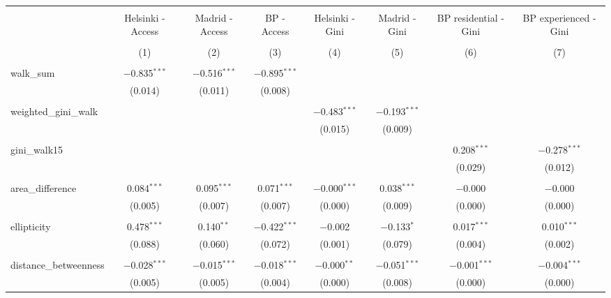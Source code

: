 
\begin{table}[!htbp] \centering 
  \caption{} 
  \label{} 
\begin{tabular}{@{\extracolsep{5pt}}lccccccc} 
\\[-1.8ex]\hline 
\hline \\[-1.8ex] 
 & Helsinki - Access & Madrid - Access & BP - Access & Helsinki - Gini & Madrid - Gini & BP residential - Gini & BP experienced - Gini \\ 
\\[-1.8ex] & (1) & (2) & (3) & (4) & (5) & (6) & (7)\\ 
\hline \\[-1.8ex] 
 walk\_sum & $-$0.835$^{***}$ & $-$0.516$^{***}$ & $-$0.895$^{***}$ &  &  &  &  \\ 
  & (0.014) & (0.011) & (0.008) &  &  &  &  \\ 
  & & & & & & & \\ 
 weighted\_gini\_walk &  &  &  & $-$0.483$^{***}$ & $-$0.193$^{***}$ &  &  \\ 
  &  &  &  & (0.015) & (0.009) &  &  \\ 
  & & & & & & & \\ 
 gini\_walk15 &  &  &  &  &  & 0.208$^{***}$ & $-$0.278$^{***}$ \\ 
  &  &  &  &  &  & (0.029) & (0.012) \\ 
  & & & & & & & \\ 
 area\_difference & 0.084$^{***}$ & 0.095$^{***}$ & 0.071$^{***}$ & $-$0.000$^{***}$ & 0.038$^{***}$ & $-$0.000 & $-$0.000 \\ 
  & (0.005) & (0.007) & (0.007) & (0.000) & (0.009) & (0.000) & (0.000) \\ 
  & & & & & & & \\ 
 ellipticity & 0.478$^{***}$ & 0.140$^{**}$ & $-$0.422$^{***}$ & $-$0.002 & $-$0.133$^{*}$ & 0.017$^{***}$ & 0.010$^{***}$ \\ 
  & (0.088) & (0.060) & (0.072) & (0.001) & (0.079) & (0.004) & (0.002) \\ 
  & & & & & & & \\ 
 distance\_betweenness & $-$0.028$^{***}$ & $-$0.015$^{***}$ & $-$0.018$^{***}$ & $-$0.000$^{**}$ & $-$0.051$^{***}$ & $-$0.001$^{***}$ & $-$0.004$^{***}$ \\ 
  & (0.005) & (0.005) & (0.004) & (0.000) & (0.008) & (0.000) & (0.000) \\ 

\end{tabular}
\end{table}
